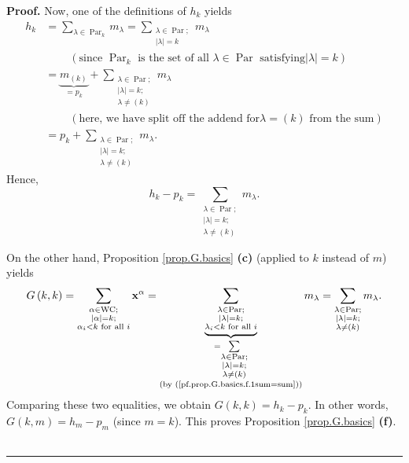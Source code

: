 \documentclass[numbers=enddot,12pt,final,onecolumn,notitlepage]{scrartcl}%
\theoremstyle{definition}
\newenvironment{proof}[1][Proof]{\noindent\textbf{#1.} }{\ \rule{0.5em}{0.5em}}
\let\sumnonlimits\sum
\renewcommand{\sum}{\sumnonlimits\limits}
\newenvironment{verlong}{}{}
\begin{document}
\begin{verlong}
\begin{proof}
Now, one of the definitions of $h_{k}$ yields%
\begin{align*}
h_{k}  &  =\sum_{\lambda\in\operatorname*{Par}\nolimits_{k}}m_{\lambda}%
=\sum_{\substack{\lambda\in\operatorname*{Par};\\\left\vert \lambda\right\vert
=k}}m_{\lambda}\\
&  \ \ \ \ \ \ \ \ \ \ \left(  \text{since }\operatorname*{Par}\nolimits_{k}%
\text{ is the set of all }\lambda\in\operatorname*{Par}\text{ satisfying
}\left\vert \lambda\right\vert =k\right) \\
&  =\underbrace{m_{\left(  k\right)  }}_{=p_{k}}+\sum_{\substack{\lambda
\in\operatorname*{Par};\\\left\vert \lambda\right\vert =k;\\\lambda\neq\left(
k\right)  }}m_{\lambda}\\
&  \ \ \ \ \ \ \ \ \ \ \left(  \text{here, we have split off the addend for
}\lambda=\left(  k\right)  \text{ from the sum}\right) \\
&  =p_{k}+\sum_{\substack{\lambda\in\operatorname*{Par};\\\left\vert
\lambda\right\vert =k;\\\lambda\neq\left(  k\right)  }}m_{\lambda}.
\end{align*}
Hence,%
\[
h_{k}-p_{k}=\sum_{\substack{\lambda\in\operatorname*{Par};\\\left\vert
\lambda\right\vert =k;\\\lambda\neq\left(  k\right)  }}m_{\lambda}.
\]


On the other hand, Proposition \ref{prop.G.basics} \textbf{(c)} (applied to
$k$ instead of $m$) yields%
\[
G\left(  k,k\right)  =\sum_{\substack{\alpha\in\operatorname*{WC};\\\left\vert
\alpha\right\vert =k;\\\alpha_{i}<k\text{ for all }i}}\mathbf{x}^{\alpha
}=\underbrace{\sum_{\substack{\lambda\in\operatorname*{Par};\\\left\vert
\lambda\right\vert =k;\\\lambda_{i}<k\text{ for all }i}}}_{\substack{=\sum
_{\substack{\lambda\in\operatorname*{Par};\\\left\vert \lambda\right\vert
=k;\\\lambda\neq\left(  k\right)  }}\\\text{(by
(\ref{pf.prop.G.basics.f.1sum=sum}))}}}m_{\lambda}=\sum_{\substack{\lambda
\in\operatorname*{Par};\\\left\vert \lambda\right\vert =k;\\\lambda\neq\left(
k\right)  }}m_{\lambda}.
\]
Comparing these two equalities, we obtain $G\left(  k,k\right)  =h_{k}-p_{k}$.
In other words, $G\left(  k,m\right)  =h_{m}-p_{m}$ (since $m=k$). This proves
Proposition \ref{prop.G.basics} \textbf{(f)}.
\end{proof}
\end{verlong}
\end{document}
